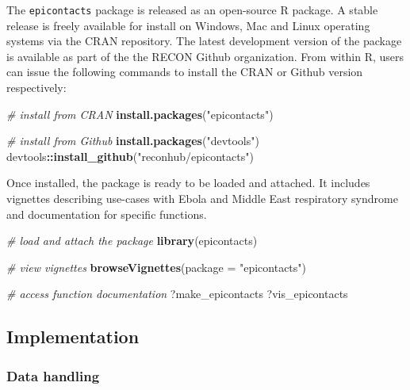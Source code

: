 \documentclass[9pt,a4paper,]{extarticle}
\newenvironment{Shaded}{\begin{snugshade}}{\end{snugshade}}
\newcommand{\KeywordTok}[1]{\textcolor[rgb]{0.13,0.29,0.53}{\textbf{#1}}}
\newcommand{\DataTypeTok}[1]{\textcolor[rgb]{0.13,0.29,0.53}{#1}}
\newcommand{\StringTok}[1]{\textcolor[rgb]{0.31,0.60,0.02}{#1}}
\newcommand{\CommentTok}[1]{\textcolor[rgb]{0.56,0.35,0.01}{\textit{#1}}}
\newcommand{\OperatorTok}[1]{\textcolor[rgb]{0.81,0.36,0.00}{\textbf{#1}}}
\newcommand{\NormalTok}[1]{#1}
\theoremstyle{definition}
\theoremstyle{definition}
\theoremstyle{definition}
\theoremstyle{remark}
\begin{document}
The \texttt{epicontacts} package is released as an open-source R package. A stable release is freely available for install on Windows, Mac and Linux operating systems via the CRAN repository. The latest development version of the package is available as part of the the RECON Github organization. From within R, users can issue the following commands to install the CRAN or Github version respectively:

\begin{Shaded}
\begin{Highlighting}[]
\CommentTok{# install from CRAN}
\KeywordTok{install.packages}\NormalTok{(}\StringTok{"epicontacts"}\NormalTok{)}

\CommentTok{# install from Github}
\KeywordTok{install.packages}\NormalTok{(}\StringTok{"devtools"}\NormalTok{)}
\NormalTok{devtools}\OperatorTok{::}\KeywordTok{install_github}\NormalTok{(}\StringTok{"reconhub/epicontacts"}\NormalTok{)}
\end{Highlighting}
\end{Shaded}

Once installed, the package is ready to be loaded and attached. It includes vignettes describing use-cases with Ebola and Middle East respiratory syndrome and documentation for specific functions.

\begin{Shaded}
\begin{Highlighting}[]
\CommentTok{# load and attach the package}
\KeywordTok{library}\NormalTok{(epicontacts)}
\end{Highlighting}
\end{Shaded}

\begin{Shaded}
\begin{Highlighting}[]
\CommentTok{# view vignettes}
\KeywordTok{browseVignettes}\NormalTok{(}\DataTypeTok{package =} \StringTok{"epicontacts"}\NormalTok{)}

\CommentTok{# access function documentation}
\NormalTok{?make_epicontacts}
\NormalTok{?vis_epicontacts}
\end{Highlighting}
\end{Shaded}

\subsection{Implementation}\label{implementation}

\subsubsection{Data handling}\label{data-handling}
\end{document}
